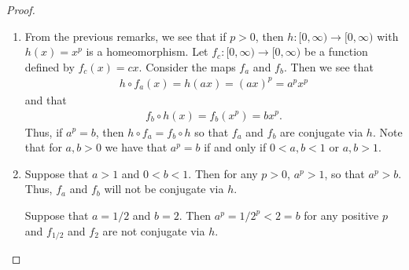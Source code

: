 \begin{proof}
\begin{enumerate}
    \item From the previous remarks, we see that if $p >0$,
      then $h: [0, \infty) \to [0, \infty) $ with $h(x) = x^p$ is a homeomorphism.
      Let $f_c: [0, \infty) \to [0, \infty)$ be a function defined by $f_c(x) = cx$.
      Consider the maps $f_a$ and $f_b$. Then we see that
      \begin{align*}
        h \circ f_a (x)= h(ax) = (ax)^p = a^p x^p
      \end{align*}
      and that
      \begin{align*}
        f_b \circ h(x) = f_b(x^p) = b x^p.
      \end{align*}
      Thus, if $a^p = b$, then $h \circ f_a = f_b \circ h$ so that $f_a$ and $f_b$ are conjugate via $h$.
      Note that for $a,b > 0$ we have that  $a^p = b$ if and only if $0 < a,b < 1$ or $a, b > 1$.

    \item Suppose that $a > 1$ and $0 < b < 1$. Then for any $p > 0$, $a^p > 1$,
      so that $a^p > b$. Thus, $f_a$ and $f_b$ will not be conjugate via $h$.

      Suppose that $a=1/2$ and $b=2$. Then $a^p=1/2^p < 2 = b$ for any positive $p$ and $f_{1/2}$ and $f_2$ are
      not conjugate via $h$.
  \end{enumerate}
\end{proof}
\newpage
